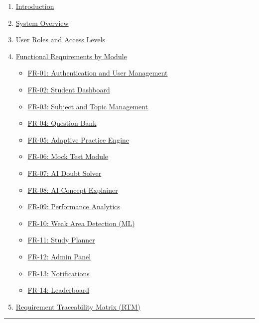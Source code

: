 \documentclass[
]{article}
\providecommand{\tightlist}{%
  \setlength{\itemsep}{0pt}\setlength{\parskip}{0pt}}
\begin{document}
\begin{enumerate}
\def\labelenumi{\arabic{enumi}.}
\tightlist
\item
  \hyperref[1-introduction]{Introduction}
\item
  \hyperref[2-system-overview]{System Overview}
\item
  \hyperref[3-user-roles-and-access-levels]{User Roles and Access
  Levels}
\item
  \hyperref[4-functional-requirements-by-module]{Functional Requirements
  by Module}

  \begin{itemize}
  \tightlist
  \item
    \hyperref[fr-01-authentication-and-user-management]{FR-01:
    Authentication and User Management}
  \item
    \hyperref[fr-02-student-dashboard]{FR-02: Student Dashboard}
  \item
    \hyperref[fr-03-subject-and-topic-management]{FR-03: Subject and
    Topic Management}
  \item
    \hyperref[fr-04-question-bank]{FR-04: Question Bank}
  \item
    \hyperref[fr-05-adaptive-practice-engine]{FR-05: Adaptive Practice
    Engine}
  \item
    \hyperref[fr-06-mock-test-module]{FR-06: Mock Test Module}
  \item
    \hyperref[fr-07-ai-doubt-solver]{FR-07: AI Doubt Solver}
  \item
    \hyperref[fr-08-ai-concept-explainer]{FR-08: AI Concept Explainer}
  \item
    \hyperref[fr-09-performance-analytics]{FR-09: Performance Analytics}
  \item
    \hyperref[fr-10-weak-area-detection-ml]{FR-10: Weak Area Detection
    (ML)}
  \item
    \hyperref[fr-11-study-planner]{FR-11: Study Planner}
  \item
    \hyperref[fr-12-admin-panel]{FR-12: Admin Panel}
  \item
    \hyperref[fr-13-notifications]{FR-13: Notifications}
  \item
    \hyperref[fr-14-leaderboard]{FR-14: Leaderboard}
  \end{itemize}
\item
  \hyperref[5-requirement-traceability-matrix-rtm]{Requirement
  Traceability Matrix (RTM)}
\end{enumerate}

\begin{center}\rule{0.5\linewidth}{0.5pt}\end{center}
\end{document}
